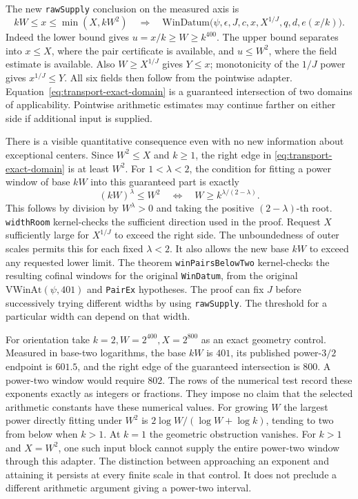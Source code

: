 \documentclass[12pt,letterpaper]{article}
\begin{document}
The new \texttt{rawSupply} conclusion on the measured axis is
\begin{equation}
 kW\le x\le\min(X,kW^2)
 \quad\Longrightarrow\quad
 \mathrm{WinDatum}\bigl(\psi,\epsilon,J,c,x,X^{1/J},q,d,e(x/k)\bigr).
 \label{eq:transport-exact-domain}
\end{equation}
Indeed the lower bound gives \(u=x/k\ge W\ge k^{400}\). The upper bound separates into \(x\le X\), where the pair certificate is available, and \(u\le W^2\), where the field estimate is available. Also \(W\ge X^{1/J}\) gives \(Y\le x\); monotonicity of the \(1/J\) power gives \(x^{1/J}\le Y\). All six fields then follow from the pointwise adapter. Equation~\eqref{eq:transport-exact-domain} is a guaranteed intersection of two domains of applicability. Pointwise arithmetic estimates may continue farther on either side if additional input is supplied.

There is a visible quantitative consequence even with no new information about exceptional centers. Since \(W^2\le X\) and \(k\ge1\), the right edge in \eqref{eq:transport-exact-domain} is at least \(W^2\). For \(1<\lambda<2\), the condition for fitting a power window of base \(kW\) into this guaranteed part is exactly
\begin{equation}
       (kW)^\lambda\le W^2
       \quad\Longleftrightarrow\quad
       W\ge k^{\lambda/(2-\lambda)} .
       \label{eq:transport-width}
\end{equation}
This follows by division by \(W^\lambda>0\) and taking the positive \((2-\lambda)\)-th root. \texttt{widthRoom} kernel-checks the sufficient direction used in the proof. Request \(X\) sufficiently large for \(X^{1/J}\) to exceed the right side. The unboundedness of outer scales permits this for each fixed \(\lambda<2\). It also allows the new base \(kW\) to exceed any requested lower limit. The theorem \texttt{winPairsBelowTwo} kernel-checks the resulting cofinal windows for the original \texttt{WinDatum}, from the original \(\mathrm{VWinAt}(\psi,401)\) and \texttt{PairEx} hypotheses. The proof can fix \(J\) before successively trying different widths by using \texttt{rawSupply}. The threshold for a particular width can depend on that width.

For orientation take \(k=2,W=2^{400},X=2^{800}\) as an exact geometry control. Measured in base-two logarithms, the base \(kW\) is \(401\), its published power-\(3/2\) endpoint is \(601.5\), and the right edge of the guaranteed intersection is \(800\). A power-two window would require \(802\). The rows of the numerical test record these exponents exactly as integers or fractions. They impose no claim that the selected arithmetic constants have these numerical values. For growing \(W\) the largest power directly fitting under \(W^2\) is \(2\log W/(\log W+\log k)\), tending to two from below when \(k>1\). At \(k=1\) the geometric obstruction vanishes. For \(k>1\) and \(X=W^2\), one such input block cannot supply the entire power-two window through this adapter. The distinction between approaching an exponent and attaining it persists at every finite scale in that control. It does not preclude a different arithmetic argument giving a power-two interval.
\end{document}
